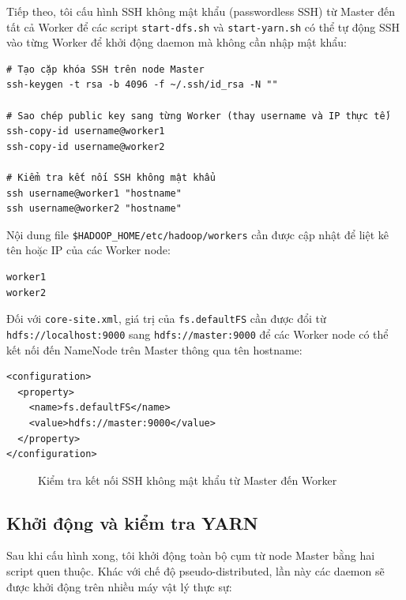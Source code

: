 \documentclass[12pt,a4paper]{article}
\begin{document}
Tiếp theo, tôi cấu hình SSH không mật khẩu (passwordless SSH) từ Master đến tất cả
Worker để các script \texttt{start-dfs.sh} và \texttt{start-yarn.sh} có thể tự động
SSH vào từng Worker để khởi động daemon mà không cần nhập mật khẩu:

\begin{verbatim}
# Tạo cặp khóa SSH trên node Master
ssh-keygen -t rsa -b 4096 -f ~/.ssh/id_rsa -N ""

# Sao chép public key sang từng Worker (thay username và IP thực tế)
ssh-copy-id username@worker1
ssh-copy-id username@worker2

# Kiểm tra kết nối SSH không mật khẩu
ssh username@worker1 "hostname"
ssh username@worker2 "hostname"
\end{verbatim}

Nội dung file \texttt{\$HADOOP\_HOME/etc/hadoop/workers} cần được cập nhật để liệt
kê tên hoặc IP của các Worker node:

\begin{verbatim}
worker1
worker2
\end{verbatim}

Đối với \texttt{core-site.xml}, giá trị của \texttt{fs.defaultFS} cần được đổi từ
\texttt{hdfs://localhost:9000} sang \texttt{hdfs://master:9000} để các Worker node
có thể kết nối đến NameNode trên Master thông qua tên hostname:

\begin{verbatim}
<configuration>
  <property>
    <name>fs.defaultFS</name>
    <value>hdfs://master:9000</value>
  </property>
</configuration>
\end{verbatim}

\begin{figure}[H]
  \centering
  \caption{Kiểm tra kết nối SSH không mật khẩu từ Master đến Worker}
  \label{fig:ssh-test}
\end{figure}

\subsection{Khởi động và kiểm tra YARN}

Sau khi cấu hình xong, tôi khởi động toàn bộ cụm từ node Master bằng hai script
quen thuộc. Khác với chế độ pseudo-distributed, lần này các daemon sẽ được khởi
động trên nhiều máy vật lý thực sự:
\end{document}
